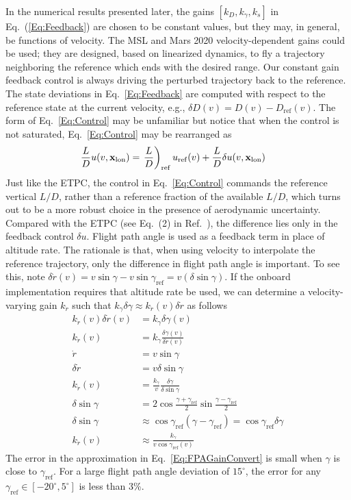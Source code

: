 In the numerical results presented later, the gains $[k_D, k_{\gamma}, k_s]$ in Eq.~(\ref{Eq:Feedback}) are chosen to be constant values, but they may, in general, be functions of velocity. 
The MSL and Mars 2020 velocity-dependent gains could be used; they are designed, based on linearized dynamics, to fly a trajectory neighboring the reference which ends with the desired range. Our constant gain feedback control is always driving the perturbed trajectory back to the reference. %
The state deviations in Eq.~\eqref{Eq:Feedback} are computed with respect to the reference state at the current velocity, e.g., $\delta D(v) = D(v) - D_{\mathrm{ref}}(v)$.
The form of Eq.~\eqref{Eq:Control} may be unfamiliar but notice that when the control is not saturated, Eq.~\eqref{Eq:Control} may be rearranged as
\begin{align}
	\frac{L}{D}u(v,\mathbf{x}_{\mathrm{lon}}) &= \left. \frac{L}{D}\right)_{\mathrm{ref}}u_{\mathrm{ref}}(v) + \frac{L}{D}\delta u(v,\mathbf{x}_{\mathrm{lon}}) \label{Eq:Control_rearranged}
\end{align}
Just like the ETPC, the control in Eq.~\eqref{Eq:Control} commands the reference vertical $ L/D $, rather than a reference fraction of the available $ L/D $, which turns out to be a more robust choice in the presence of aerodynamic uncertainty. Compared with the ETPC (see Eq.~(2) in Ref.~\cite{MSL_EDL2}), the difference lies only in the feedback control $\delta u$. Flight path angle is used as a feedback term in place of altitude rate. The rationale is that, when using velocity to interpolate the reference trajectory, only the difference in flight path angle is important. To see this, note $\delta\dot{r}(v) = v\sin\gamma - v\sin\gamma_{\mathrm{ref}} = v(\delta\sin\gamma)$. If the onboard implementation requires that altitude rate be used, we can determine a velocity-varying gain $k_{\dot{r}}$ such that $k_\gamma\delta\gamma \approx k_{\dot{r}}(v)\delta\dot{r}$ as follows
\begin{align}
k_{\dot{r}}(v)\delta\dot{r}(v) &= k_{\gamma}\delta\gamma(v) \\
k_{\dot{r}}(v) &= k_{\gamma}\frac{\delta\gamma(v)}{\delta\dot{r}(v)} \\
\dot{r} &= v\sin\gamma \\
\delta \dot{r} &= v\delta\sin\gamma \\
k_{\dot{r}}(v) &= \frac{k_{\gamma}}{v}\frac{\delta\gamma}{\delta\sin\gamma} \\
\delta\sin\gamma &= 2\cos\frac{\gamma+\gamma_{\mathrm{ref}}}{2}\sin\frac{\gamma-\gamma_{\mathrm{ref}}}{2} \\
\delta\sin\gamma &\approx \cos\gamma_{\mathrm{ref}}(\gamma-\gamma_{\mathrm{ref}}) = \cos\gamma_{\mathrm{ref}}\delta\gamma\label{Eq:FPAGainConvert}\\
k_{\dot{r}}(v) &\approx \frac{k_{\gamma}}{v\cos\gamma_{\mathrm{ref}}(v)}
\end{align}
The error in the approximation in Eq.~\ref{Eq:FPAGainConvert} is small when $\gamma$ is close to $\gamma_{\mathrm{ref}}$. For a large flight path angle deviation of $15^{\circ}$, the error for any $\gamma_{\mathrm{ref}}\in[-20^{\circ},5^{\circ}]$ is less than 3\%. 

